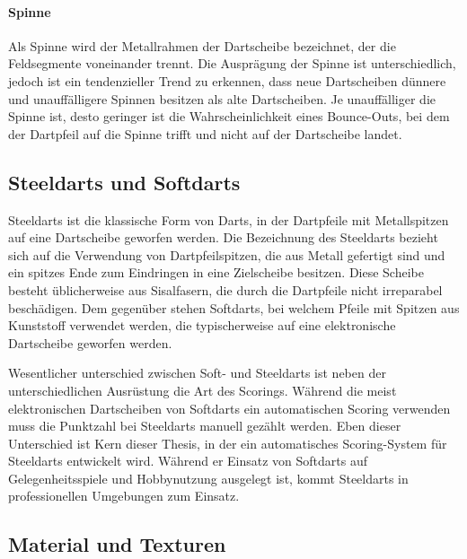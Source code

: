 \paragraph{Spinne}

Als Spinne wird der Metallrahmen der Dartscheibe bezeichnet, der die Feldsegmente voneinander trennt. Die Ausprägung der Spinne ist unterschiedlich, jedoch ist ein tendenzieller Trend zu erkennen, dass neue Dartscheiben dünnere und unauffälligere Spinnen besitzen als alte Dartscheiben. Je unauffälliger die Spinne ist, desto geringer ist die Wahrscheinlichkeit eines Bounce-Outs, bei dem der Dartpfeil auf die Spinne trifft und nicht auf der Dartscheibe landet.


\subsection{Steeldarts und Softdarts}
\label{sec:steeldarts}

Steeldarts ist die klassische Form von Darts, in der Dartpfeile mit Metallspitzen auf eine Dartscheibe geworfen werden. Die Bezeichnung des Steeldarts bezieht sich auf die Verwendung von Dartpfeilspitzen, die aus Metall gefertigt sind und ein spitzes Ende zum Eindringen in eine Zielscheibe besitzen. Diese Scheibe besteht üblicherweise aus Sisalfasern, die durch die Dartpfeile nicht irreparabel beschädigen. Dem gegenüber stehen Softdarts, bei welchem Pfeile mit Spitzen aus Kunststoff verwendet werden, die typischerweise auf eine elektronische Dartscheibe geworfen werden.

Wesentlicher unterschied zwischen Soft- und Steeldarts ist neben der unterschiedlichen Ausrüstung die Art des Scorings. Während die meist elektronischen Dartscheiben von Softdarts ein automatischen Scoring verwenden muss die Punktzahl bei Steeldarts manuell gezählt werden. Eben dieser Unterschied ist Kern dieser Thesis, in der ein automatisches Scoring-System für Steeldarts entwickelt wird. Während er Einsatz von Softdarts auf Gelegenheitsspiele und Hobbynutzung ausgelegt ist, kommt Steeldarts in professionellen Umgebungen zum Einsatz.


\subsection{Material und Texturen}  %
\label{sec:material_texturen}

